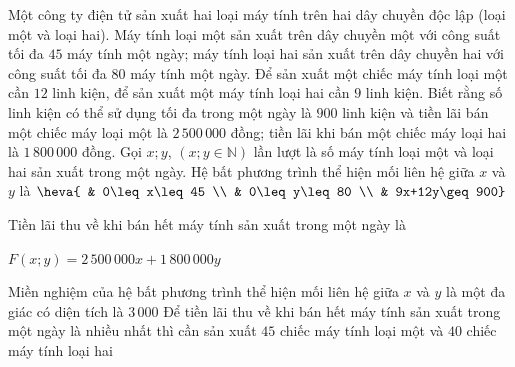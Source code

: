 \begin{ex}%
	Một công ty điện tử sản xuất hai loại máy tính trên hai dây chuyền độc lập (loại một và loại hai). Máy tính loại một sản xuất trên dây chuyền một với công suất tối đa $45$ máy tính một ngày; máy tính loại hai sản xuất trên dây chuyền hai với công suất tối đa $80$ máy tính một ngày. Để sản xuất một chiếc máy tính loại một cần $12$ linh kiện, để sản xuất một máy tính loại hai cần $9$ linh kiện. Biết rằng số linh kiện có thể sử dụng tối đa trong một ngày là $900$ linh kiện và tiền lãi bán một chiếc máy loại một là $2\,500\,000$ đồng; tiền lãi khi bán một chiếc máy loại hai là $1\,800\,000$ đồng. Gọi $x;y$, $\left( x;y\in \mathbb{N} \right)$ lần lượt là số máy tính loại một và loại hai sản xuất trong một ngày.
	\choiceTF
	{Hệ bất phương trình thể hiện mối liên hệ giữa $x$ và $y$ là $\heva{
			& 0\leq x\leq 45 \\ 
			& 0\leq y\leq 80 \\ 
			& 9x+12y\geq 900}$}
	{\True Tiền lãi thu về khi bán hết máy tính sản xuất trong một ngày là \\\centerline{$F(x;y)=2\,500\,000 x+ 1\,800\,000y$}}
	{\True Miền nghiệm của hệ bất phương trình thể hiện mối liên hệ giữa $x$ và $y$ là một đa giác có diện tích là $3\,000$}
	{\True Để tiền lãi thu về khi bán hết máy tính sản xuất trong một ngày là nhiều nhất thì cần sản xuất $45$ chiếc máy tính loại một và $40$ chiếc máy tính loại hai}
\end{ex}

